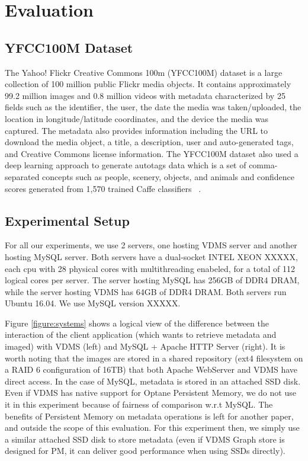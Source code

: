 \section{Evaluation}
\label{eval}

\subsection{YFCC100M Dataset}
\label{dataset}

The Yahoo! Flickr Creative Commons 100m (YFCC100M) dataset is a
large collection of 100 million public Flickr media objects.
It contains approximately 99.2 million images and 0.8 million videos
with metadata characterized by 25 fields such as the identifier,
the user, the date the media was taken/uploaded,
the location in longitude/latitude coordinates,
and the device the media was captured.
The metadata also provides information including the URL to
download the media object, a title, a description, user and
auto-generated tags, and Creative Commons license information.
The YFCC100M dataset also used a deep learning approach to generate
autotags data which is a set of comma-separated concepts such as people,
scenery, objects, and animals and confidence scores
generated from 1,570 trained Caffe classifiers ~\cite{Thomee_2016}.

\subsection{Experimental Setup}

For all our experiments, we use 2 servers, one hosting VDMS server and
another hosting MySQL server. Both servers have a dual-socket INTEL XEON XXXXX,
each cpu with 28 physical cores with multithreading enabeled,
for a total of 112 logical cores per server.
The server hosting MySQL has 256GB of DDR4 DRAM, while the server hosting VDMS
has 64GB of DDR4 DRAM. Both servers run Ubuntu 16.04.
We use MySQL version XXXXX.

Figure \ref{figure:systems} shows a logical view of the difference between the
interaction of the client application (which wants to retrieve metadata and
imaged) with VDMS (left) and MySQL + Apache HTTP Server (right).
It is worth noting that the images are stored in a shared repository
(ext4 filesystem on a RAID 6 configuration of 16TB) that both Apache WebServer
and VDMS have direct access. In the case of MySQL, metadata is stored in an
attached SSD disk. Even if VDMS has native support for Optane Persistent Memory,
we do not use it in this experiment because of fairness of comparison w.r.t
MySQL. The benefits of Persistent Memory on metadata operations is left
for another paper, and outside the scope of this evaluation.
For this experiment then, we simply use a similar attached SSD disk to store
metadata (even if VDMS Graph store is designed for PM, it can deliver good
performance when using SSDs directly).


